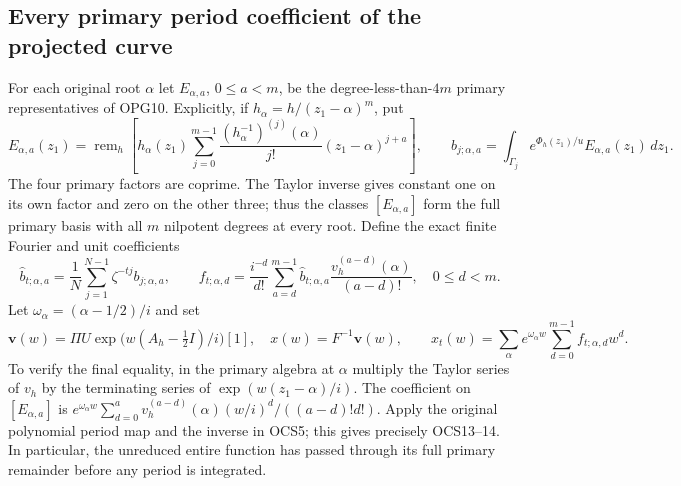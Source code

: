 \documentclass[11pt,a4paper]{article}
\begin{document}
\subsection{Every primary period coefficient of the projected curve}
For each original root $\alpha$ let $E_{\alpha,a}$, $0\leq a<m$,
be the degree-less-than-$4m$ primary representatives of OPG10.
Explicitly, if $h_\alpha=h/(z_1-\alpha)^m$, put
\[
 E_{\alpha,a}(z_1)=\operatorname{rem}_h\left[
 h_\alpha(z_1)\sum_{j=0}^{m-1}
       \frac{(h_\alpha^{-1})^{(j)}(\alpha)}{j!}
                  (z_1-\alpha)^{j+a}\right],\qquad
 b_{j;\alpha,a}=\int_{\Gamma_j}e^{\Phi_h(z_1)/u}
                                    E_{\alpha,a}(z_1)\,dz_1.
 \tag{OCS12}
\]
The four primary factors are coprime. The Taylor inverse gives
constant one on its own factor and zero on the other three;
thus the classes $[E_{\alpha,a}]$ form the full primary basis
with all $m$ nilpotent degrees at every root.
Define the exact finite Fourier and unit coefficients
\[
 \widehat b_{t;\alpha,a}=
     \frac1N\sum_{j=1}^{N-1}\zeta^{-tj}b_{j;\alpha,a},
 \qquad
 f_{t;\alpha,d}=\frac{i^{-d}}{d!}
       \sum_{a=d}^{m-1}\widehat b_{t;\alpha,a}
                         \frac{v_h^{(a-d)}(\alpha)}{(a-d)!},
 \quad0\leq d<m.
 \tag{OCS13}
\]
Let $\omega_\alpha=(\alpha-1/2)/i$ and set
\[
 \mathbf v(w)=\Pi U\exp\bigl(w(A_h-\tfrac12I)/i\bigr)[1],
 \quad x(w)=F^{-1}\mathbf v(w),\qquad
 x_t(w)=\sum_{\alpha}e^{\omega_\alpha w}
                          \sum_{d=0}^{m-1}f_{t;\alpha,d}w^d.
 \tag{OCS14}
\]
To verify the final equality, in the primary algebra at $\alpha$
multiply the Taylor series of $v_h$ by the terminating series of
$\exp(w(z_1-\alpha)/i)$. The coefficient on
$[E_{\alpha,a}]$ is
$e^{\omega_\alpha w}\sum_{d=0}^a
v_h^{(a-d)}(\alpha)(w/i)^d/((a-d)!d!)$.
Apply the original polynomial period map and the inverse in OCS5;
this gives precisely OCS13--14. In particular, the unreduced
entire function has passed through its full primary remainder
before any period is integrated.
\end{document}
